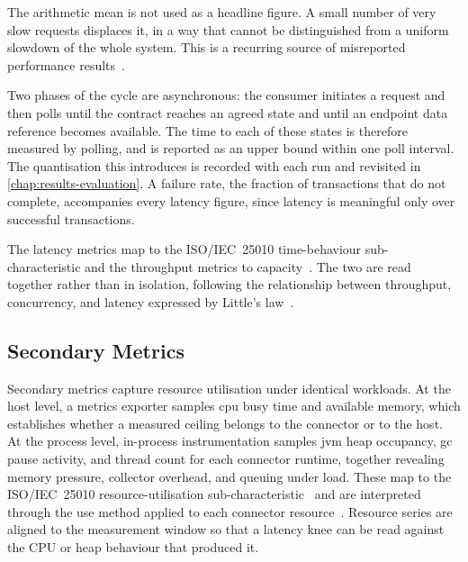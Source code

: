 The arithmetic mean is not used as a headline figure. A small number of very slow requests displaces it, in a way that cannot be distinguished from a uniform slowdown of the whole system. This is a recurring source of misreported performance results~\citep{hoefler2015scientific}.

Two phases of the cycle are asynchronous: the consumer initiates a request and then polls until the contract reaches an agreed state and until an endpoint data reference becomes available. The time to each of these states is therefore measured by polling, and is reported as an upper bound within one poll interval. The quantisation this introduces is recorded with each run and revisited in \cref{chap:results-evaluation}. A failure rate, the fraction of transactions that do not complete, accompanies every latency figure, since latency is meaningful only over successful transactions.

The latency metrics map to the ISO/IEC~25010 time-behaviour sub-characteristic and the throughput metrics to capacity~\citep{iso25010}. The two are read together rather than in isolation, following the relationship between throughput, concurrency, and latency expressed by Little's law~\citep{little1961proof}.

\pagebreak

\subsection{Secondary Metrics}\label{subsec:secondary-metrics}

Secondary metrics capture resource utilisation under identical workloads. At the host level, a metrics exporter samples \gls{cpu} busy time and available memory, which establishes whether a measured ceiling belongs to the connector or to the host. At the process level, in-process instrumentation samples \gls{jvm} heap occupancy, \gls{gc} pause activity, and thread count for each connector runtime, together revealing memory pressure, collector overhead, and queuing under load. These map to the ISO/IEC~25010 resource-utilisation sub-characteristic~\citep{iso25010} and are interpreted through the \gls{use} method applied to each connector resource~\citep{gregg2012thinking}. Resource series are aligned to the measurement window so that a latency knee can be read against the CPU or heap behaviour that produced it.

